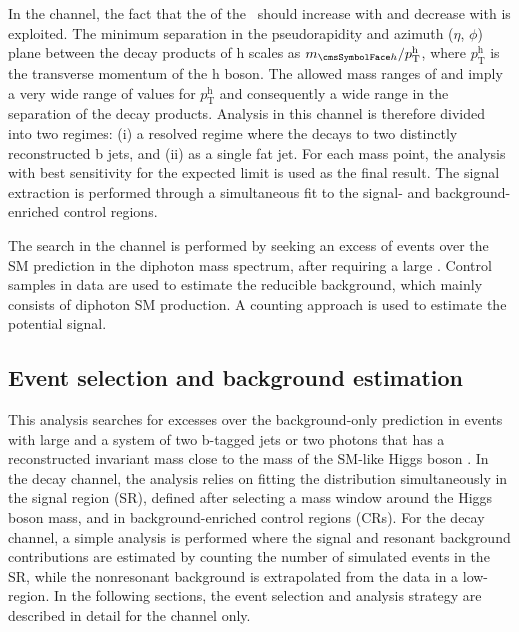 \par In the \Hbb channel, the fact that 
the \pt of the \Ph\ should increase with \mzp and 
decrease with \maz is exploited.  
The minimum separation in the pseudorapidity and azimuth ($\eta$, $\phi$) plane
between the decay products of h scales as $m_{\Ph}/p_{\mathrm{T}}^{\mathrm{h}}$, where 
$p_{\mathrm{T}}^{\mathrm{h}}$ is the transverse momentum of the h boson.  
The allowed mass ranges of \mzp and \maz
imply a very wide range of values for $p_{\mathrm{T}}^{\mathrm{h}}$ 
and consequently a wide range in the separation of the decay products.
Analysis in this channel is therefore divided into two regimes: (i) a 
resolved regime where the \Ph decays to two distinctly reconstructed b jets, %
and (ii) as a single fat jet. 
For each mass point, the analysis with best sensitivity for the expected limit is used as the final result. 
The signal extraction is performed through a simultaneous fit to the signal- and background-enriched 
control regions.  

The search in the \HGG channel is performed by seeking an excess of events 
over the SM prediction in the diphoton mass spectrum, after requiring a large 
\MET. 
Control samples in data are used to estimate the reducible background, which 
mainly consists of diphoton SM production. A counting approach is used 
to estimate the potential signal. 

\subsection{Event selection and background estimation}\label{sec:eventselection}
\label{eventselection}

This analysis searches for excesses over the background-only prediction in events with large \MET and a system of two b-tagged jets or two photons that has a reconstructed invariant mass close to the mass of the SM-like Higgs boson \Ph. 
In the \Hbb decay channel, the analysis relies on fitting the \MET distribution simultaneously in the signal region (SR), defined after selecting a mass window around the Higgs boson mass, and in background-enriched control regions (CRs). 
For the \HGG decay channel, a simple analysis is performed where the signal and resonant background contributions are estimated by counting 
the number of simulated events in the SR, while the nonresonant background is
extrapolated from the data in a low-\MET region. 
In the following sections, the event selection and analysis strategy are described in detail for the \Hbb channel only.

